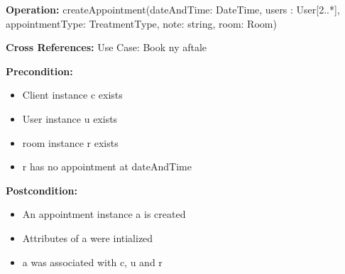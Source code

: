 {\setlength{\parindent}{0cm}
\textbf{Operation:} createAppointment(dateAndTime: DateTime, users : User[2..*], appointmentType: TreatmentType, note: string, room: Room) 

\textbf{Cross References:} Use Case: Book ny aftale 

\textbf{Precondition: }
		\begin{itemize}
			\item Client instance c exists 
			\item User instance u exists 
			\item room instance r exists 
			\item r has no appointment at dateAndTime
		\end{itemize}
		
\textbf{Postcondition:}  
        \begin{itemize}
            \item An appointment instance a is created
            \item Attributes of a were intialized
            \item a was associated with c, u and r
        \end{itemize}
        }
        
